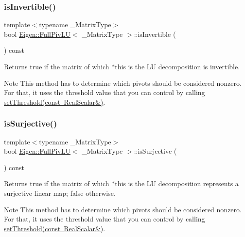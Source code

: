 \subsubsection{\texorpdfstring{isInvertible()}{isInvertible()}}
{\footnotesize\ttfamily template$<$typename \+\_\+\+Matrix\+Type$>$ \\
bool \mbox{\hyperlink{class_eigen_1_1_full_piv_l_u}{Eigen\+::\+Full\+Piv\+LU}}$<$ \+\_\+\+Matrix\+Type $>$\+::is\+Invertible (\begin{DoxyParamCaption}{ }\end{DoxyParamCaption}) const\hspace{0.3cm}{\ttfamily [inline]}}

\begin{DoxyReturn}{Returns}
true if the matrix of which $\ast$this is the LU decomposition is invertible.
\end{DoxyReturn}
\begin{DoxyNote}{Note}
This method has to determine which pivots should be considered nonzero. For that, it uses the threshold value that you can control by calling \mbox{\hyperlink{class_eigen_1_1_full_piv_l_u_a414592d82de98f5bd075965caf56d681}{set\+Threshold(const Real\+Scalar\&)}}. 
\end{DoxyNote}
\mbox{\label{class_eigen_1_1_full_piv_l_u_a1f6222875fc3a181ee1544b9b36dfda5}} 
\subsubsection{\texorpdfstring{isSurjective()}{isSurjective()}}
{\footnotesize\ttfamily template$<$typename \+\_\+\+Matrix\+Type$>$ \\
bool \mbox{\hyperlink{class_eigen_1_1_full_piv_l_u}{Eigen\+::\+Full\+Piv\+LU}}$<$ \+\_\+\+Matrix\+Type $>$\+::is\+Surjective (\begin{DoxyParamCaption}{ }\end{DoxyParamCaption}) const\hspace{0.3cm}{\ttfamily [inline]}}

\begin{DoxyReturn}{Returns}
true if the matrix of which $\ast$this is the LU decomposition represents a surjective linear map; false otherwise.
\end{DoxyReturn}
\begin{DoxyNote}{Note}
This method has to determine which pivots should be considered nonzero. For that, it uses the threshold value that you can control by calling \mbox{\hyperlink{class_eigen_1_1_full_piv_l_u_a414592d82de98f5bd075965caf56d681}{set\+Threshold(const Real\+Scalar\&)}}. 
\end{DoxyNote}
\mbox{\label{class_eigen_1_1_full_piv_l_u_a70f52eeb2cd07dfbf790fce106fb4015}} 
